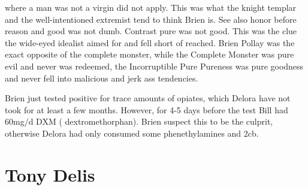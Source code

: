 \documentclass[12pt]{book}
\begin{document}
where a man was not a virgin did not apply. This was what the knight templar and the well-intentioned extremist tend to think Brien is. See also honor before reason and good was not dumb. Contrast pure was not good. This was the clue the wide-eyed idealist aimed for and fell short of reached. Brien Pollay was the exact opposite of the complete monster, while the Complete Monster was pure evil and never was redeemed, the Incorruptible Pure Pureness was pure goodness and never fell into malicious and jerk ass tendencies.



Brien just tested positive for trace amounts of opiates, which Delora have not took for at least a few months. However, for 4-5 days before the test Bill had 60mg/d DXM ( dextromethorphan). Brien suspect this to be the culprit, otherwise Delora had only consumed some phenethylamines and 2cb.



\chapter{Tony Delis}
\end{document}
